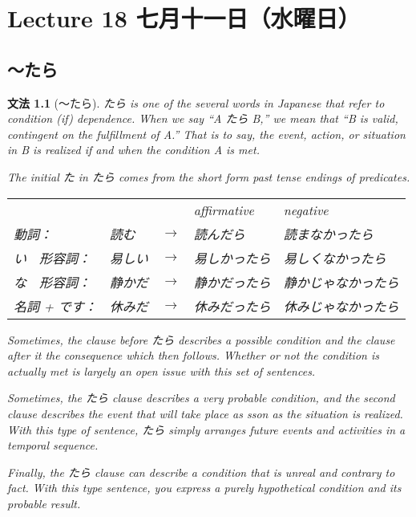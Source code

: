 \documentclass[notoc,notitlepage]{tufte-book}
\newtheorem{grammar}{\faBook \enspace 文法}[section]
\begin{document}


\chapter{Lecture 18 七月十一日（水曜日）}%
\label{chp:lecture_18_qi_yue_shi_yi_ri_shui_yao_ri_}

\section{〜たら}%
\label{sec:_tara}

\begin{grammar}[〜たら]
\label{grammar:_tara}
たら is one of the several words in Japanese that refer to condition (if) dependence. When we say ``A たら B,'' we mean that ``B is valid, contingent on the fulfillment of A.'' That is to say, the event, action, or situation in B is realized if and when the condition A is met.

The initial た in たら comes from the short form past tense endings of predicates.

\begin{tabular}{l l l l l}
 &  &  & affirmative & negative \\
動詞： & 読む & $\to$ & 読んだら & 読まなかったら \\
い　形容詞：& 易しい & $\to$ & 易しかったら & 易しくなかったら \\
な　形容詞：& 静かだ & $\to$ & 静かだったら & 静かじゃなかったら \\
名詞 + です：& 休みだ & $\to$ & 休みだったら & 休みじゃなかったら
\end{tabular}

Sometimes, the clause before たら describes a \textit{possible} condition and the clause after it the consequence which \textit{then} follows. Whether or not the condition is actually met is largely an open issue with this set of sentences.

Sometimes, the たら clause describes a very \textit{probable} condition, and the second clause describes the event that will take place \textit{as sson as} the situation is realized. With this type of sentence, たら simply arranges future events and activities in a temporal sequence.

Finally, the たら clause can describe a condition that is unreal and contrary to fact. With this type sentence, you express a purely hypothetical condition and its probable result.
\end{grammar}
\end{document}
